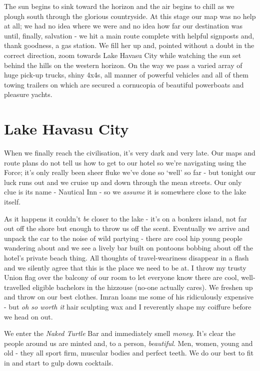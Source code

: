 \documentclass[a5paper,titlepage,11pt]{book}
\begin{document}
The sun begins to sink toward the horizon and the air begins to chill as we plough south through the glorious countryside.  At this stage our map was no help at all; we had no idea where we were and no idea how far our destination was until, finally, salvation - we hit a main route complete with helpful signposts and, thank goodness, a gas station.  We fill her up and, pointed without a doubt in the correct direction, zoom towards Lake Havasu City while watching the sun set behind the hills on the western horizon.  On the way we pass a varied array of huge pick-up trucks, shiny 4x4s, all manner of powerful vehicles and all of them towing trailers on which are secured a cornucopia of beautiful powerboats and pleasure yachts.

\section*{Lake Havasu City}
When we finally reach the civilisation, it's very dark and very late.  Our maps and route plans do not tell us how to get to our hotel so we're navigating using the Force; it's only really been sheer fluke we've done so `well' so far - but tonight our luck runs out and we cruise up and down through the mean streets.  Our only clue is its name - Nautical Inn - so we \emph{assume} it is somewhere close to the lake itself.

As it happens it couldn't \emph{be} closer to the lake - it's on a bonkers island, not far out off the shore but enough to throw us off the scent.  Eventually we arrive and unpack the car to the noise of wild partying - there are cool hip young people wandering about and we see a lively bar built on pontoons bobbing about off the hotel's private beach thing.  All thoughts of travel-weariness disappear in a flash and we silently agree that this is the place we need to be at.  I throw my trusty Union flag over the balcony of our room to let everyone know there are cool, well-travelled eligible bachelors in the hizzouse (no-one actually cares).  We freshen up and throw on our best clothes.  Imran loans me some of his ridiculously expensive - but \emph{oh so worth it} hair sculpting wax and I reverently shape my coiffure before we head on out.

We enter the \emph{Naked Turtle} Bar and immediately smell \emph{money}.  It's clear the people around us are minted and, to a person, \emph{beautiful}.  Men, women, young and old - they all sport firm, muscular bodies and perfect teeth.  We do our best to fit in and start to gulp down cocktails.
\end{document}
